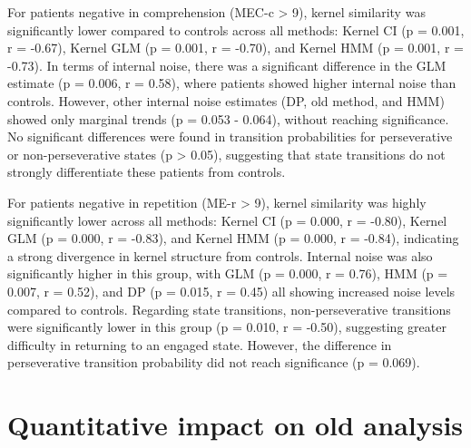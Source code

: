 For patients negative in comprehension (MEC-c > 9), kernel similarity was significantly lower compared to controls across all methods: Kernel CI (p = 0.001, r = -0.67), Kernel GLM (p = 0.001, r = -0.70), and Kernel HMM (p = 0.001, r = -0.73). In terms of internal noise, there was a significant difference in the GLM estimate (p = 0.006, r = 0.58), where patients showed higher internal noise than controls. However, other internal noise estimates (DP, old method, and HMM) showed only marginal trends (p = 0.053 - 0.064), without reaching significance. No significant differences were found in transition probabilities for perseverative or non-perseverative states (p > 0.05), suggesting that state transitions do not strongly differentiate these patients from controls.

For patients negative in repetition (ME-r > 9), kernel similarity was highly significantly lower across all methods: Kernel CI (p = 0.000, r = -0.80), Kernel GLM (p = 0.000, r = -0.83), and Kernel HMM (p = 0.000, r = -0.84), indicating a strong divergence in kernel structure from controls. Internal noise was also significantly higher in this group, with GLM (p = 0.000, r = 0.76), HMM (p = 0.007, r = 0.52), and DP (p = 0.015, r = 0.45) all showing increased noise levels compared to controls. Regarding state transitions, non-perseverative transitions were significantly lower in this group (p = 0.010, r = -0.50), suggesting greater difficulty in returning to an engaged state. However, the difference in perseverative transition probability did not reach significance (p = 0.069).

\section{Quantitative impact on old analysis}

